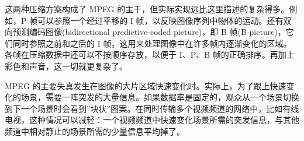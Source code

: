 这两种压缩方案构成了 MPEG
的主干，但实际实现远比这里描述的复杂得多。例如，P
帧可以参照一个经过平移的 I
帧，以反映图像序列中物体的运动。还有双向预测编码图像(bidirectional
predictive-coded picture)，即 B 帧(B-picture)，它们同时参照之前和之后的
I
帧。这用来处理图像中在许多帧内逐渐变化的区域。各帧在压缩数据中还可以不按顺序存放，以便于
I、P、B 帧的正确排序。再加上彩色和声音，这一切就更复杂了。

MPEG
的主要失真发生在图像的大片区域快速变化时。实际上，为了跟上快速变化的场景，需要一阵突发的大量信息。如果数据率是固定的，观众从一个场景切换到下一个场景时会看到''块状''图案。在同时传输多个视频频道的网络中，比如有线电视，这种情况可以减轻：一个视频频道中快速变化场景所需的突发信息，与其他频道中相对静止的场景所需的少量信息平均掉了。
